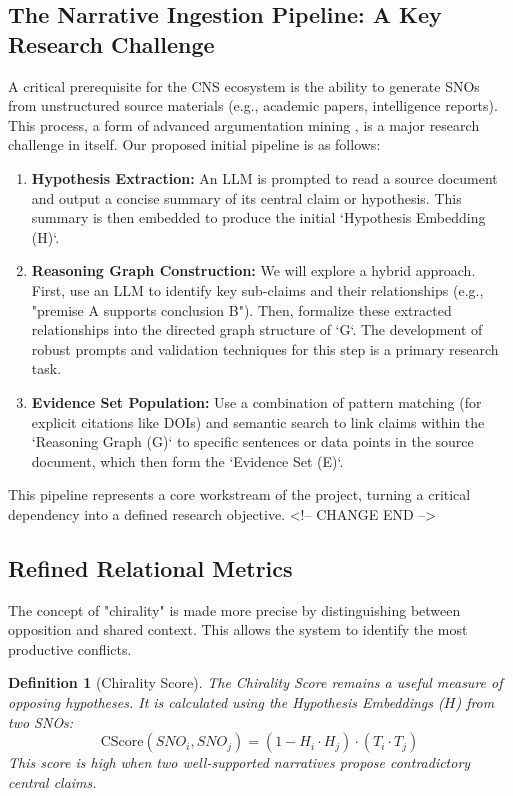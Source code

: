 \documentclass[12pt, a4paper]{article}
\newtheorem{definition}{Definition}[section]
\begin{document}
\subsection{The Narrative Ingestion Pipeline: A Key Research Challenge}
A critical prerequisite for the CNS ecosystem is the ability to generate SNOs from unstructured source materials (e.g., academic papers, intelligence reports). This process, a form of advanced argumentation mining \cite{Lippi2016ArgMining}, is a major research challenge in itself. Our proposed initial pipeline is as follows:
\begin{enumerate}
    \item \textbf{Hypothesis Extraction:} An LLM is prompted to read a source document and output a concise summary of its central claim or hypothesis. This summary is then embedded to produce the initial `Hypothesis Embedding (H)`.
    \item \textbf{Reasoning Graph Construction:} We will explore a hybrid approach. First, use an LLM to identify key sub-claims and their relationships (e.g., "premise A supports conclusion B"). Then, formalize these extracted relationships into the directed graph structure of `G`. The development of robust prompts and validation techniques for this step is a primary research task.
    \item \textbf{Evidence Set Population:} Use a combination of pattern matching (for explicit citations like DOIs) and semantic search to link claims within the `Reasoning Graph (G)` to specific sentences or data points in the source document, which then form the `Evidence Set (E)`.
\end{enumerate}
This pipeline represents a core workstream of the project, turning a critical dependency into a defined research objective.
<!-- CHANGE END -->

\subsection{Refined Relational Metrics}
The concept of "chirality" is made more precise by distinguishing between opposition and shared context. This allows the system to identify the most productive conflicts.

\begin{definition}[Chirality Score]
The Chirality Score remains a useful measure of opposing \textit{hypotheses}. It is calculated using the Hypothesis Embeddings ($H$) from two SNOs:
\[
\text{CScore}(SNO_i, SNO_j) = (1 - H_i \cdot H_j) \cdot (T_i \cdot T_j)
\]
This score is high when two well-supported narratives propose contradictory central claims.
\end{definition}
\end{document}
